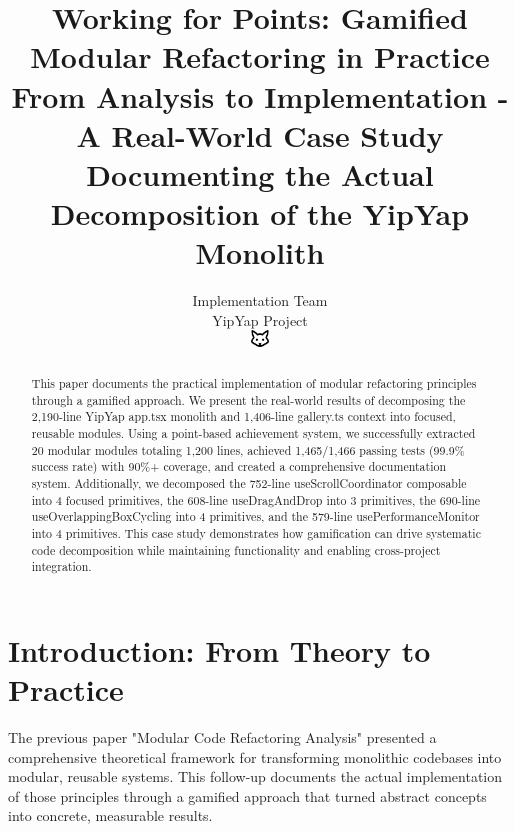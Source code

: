 \documentclass[11pt]{article}
\begin{document}
\title{\textbf{Working for Points: Gamified Modular Refactoring in Practice} \\
\Large{From Analysis to Implementation - A Real-World Case Study} \\
\large{Documenting the Actual Decomposition of the YipYap Monolith}}

\author{Implementation Team\\
YipYap Project\\
\includegraphics[width=0.5cm]{favicon.pdf}}

\maketitle

\begin{abstract}
This paper documents the practical implementation of modular refactoring principles through a gamified approach. We present the real-world results of decomposing the 2,190-line YipYap app.tsx monolith and 1,406-line gallery.ts context into focused, reusable modules. Using a point-based achievement system, we successfully extracted 20 modular modules totaling 1,200 lines, achieved 1,465/1,466 passing tests (99.9\% success rate) with 90\%+ coverage, and created a comprehensive documentation system. Additionally, we decomposed the 752-line useScrollCoordinator composable into 4 focused primitives, the 608-line useDragAndDrop into 3 primitives, the 690-line useOverlappingBoxCycling into 4 primitives, and the 579-line usePerformanceMonitor into 4 primitives. This case study demonstrates how gamification can drive systematic code decomposition while maintaining functionality and enabling cross-project integration.
\end{abstract}

\tableofcontents
\newpage

\section{Introduction: From Theory to Practice}

The previous paper "Modular Code Refactoring Analysis" presented a comprehensive theoretical framework for transforming monolithic codebases into modular, reusable systems. This follow-up documents the actual implementation of those principles through a gamified approach that turned abstract concepts into concrete, measurable results.
\end{document}
